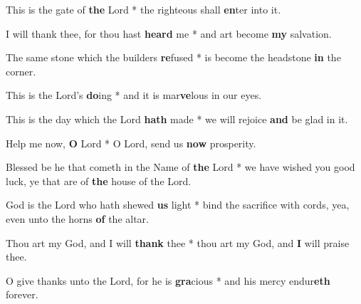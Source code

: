 \begin{multicols}{2}
	This is the gate of \textbf{the} Lord * the righteous shall \textbf{en}ter into it.
	
	I will thank thee, for thou hast \textbf{heard} me * and art become \textbf{my} salvation.
	
	The same stone which the builders \textbf{re}fused * is become the headstone \textbf{in} the corner.
	
	This is the Lord's \textbf{do}ing * and it is mar\textbf{ve}lous in our eyes.
	
	This is the day which the Lord \textbf{hath} made * we will rejoice \textbf{and} be glad in it.
	
	Help me now, \textbf{O} Lord * O Lord, send us \textbf{now} prosperity.
	
	Blessed be he that cometh in the Name of \textbf{the} Lord * we have wished you good luck, ye that are of \textbf{the} house of the Lord.
	
	God is the Lord who hath shewed \textbf{us} light * bind the sacrifice with cords, yea, even unto the horns \textbf{of} the altar.
	
	Thou art my God, and I will \textbf{thank} thee * thou art my God, and \textbf{I} will praise thee.
	
	O give thanks unto the Lord, for he is \textbf{gra}cious * and his mercy endur\textbf{eth} forever.
\end{multicols}
